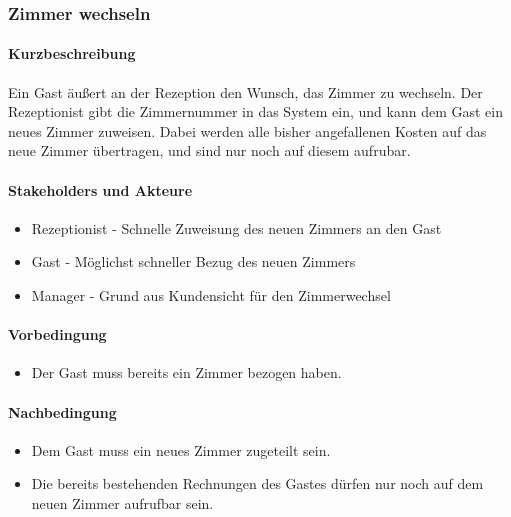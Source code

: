 \subsubsection{Zimmer wechseln}

\paragraph{Kurzbeschreibung}
Ein \Gls{Gast} äußert an der \Gls{Rezeption} den Wunsch, das \Gls{Zimmer} zu wechseln. Der \Gls{Rezeptionist} gibt die \Gls{Zimmernummer} in das System ein, und kann dem \Gls{Gast} ein neues \Gls{Zimmer} zuweisen. Dabei werden alle bisher angefallenen Kosten auf das neue \Gls{Zimmer} übertragen, und sind nur noch auf diesem aufrubar.

\paragraph{Stakeholders und Akteure}
\begin{itemize}
	\item Rezeptionist - Schnelle Zuweisung des neuen \Gls{Zimmer}s an den \Gls{Gast}
	\item Gast - Möglichst schneller Bezug des neuen \Gls{Zimmer}s
	\item Manager - Grund aus Kundensicht für den \Gls{Zimmer}wechsel
\end{itemize}

\paragraph{Vorbedingung}
\begin{itemize}
	\item Der \Gls{Gast} muss bereits ein \Gls{Zimmer} bezogen haben.
\end{itemize}

\paragraph{Nachbedingung}
\begin{itemize}
	\item Dem \Gls{Gast} muss ein neues Zimmer zugeteilt sein.
	\item Die bereits bestehenden Rechnungen des \Gls{Gast}es dürfen nur noch auf dem neuen \Gls{Zimmer} aufrufbar sein.
\end{itemize}

